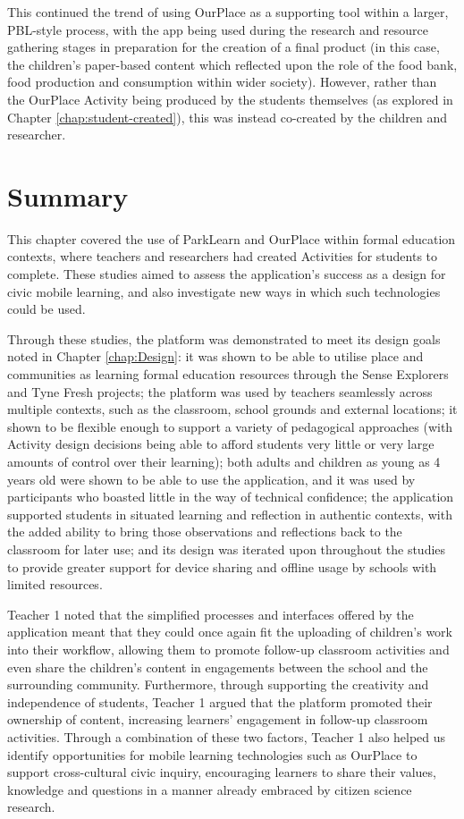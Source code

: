 This continued the trend of using OurPlace as a supporting tool within a larger, PBL-style process, with the app being used during the research and resource gathering stages in preparation for the creation of a final product (in this case, the children's paper-based content which reflected upon the role of the food bank, food production and consumption within wider society). However, rather than the OurPlace Activity being produced by the students themselves (as explored in Chapter \ref{chap:student-created}), this was instead co-created by the children and researcher.

\section{Summary}

This chapter covered the use of ParkLearn and OurPlace within formal education contexts, where teachers and researchers had created Activities for students to complete. These studies aimed to assess the application's success as a design for civic mobile learning, and also investigate new ways in which such technologies could be used. 

Through these studies, the platform was demonstrated to meet its design goals noted in Chapter \ref{chap:Design}: it was shown to be able to utilise place and communities as learning formal education resources through the Sense Explorers and Tyne Fresh projects; the platform was used by teachers seamlessly across multiple contexts, such as the classroom, school grounds and external locations; it shown to be flexible enough to support a variety of pedagogical approaches (with Activity design decisions being able to afford students very little or very large amounts of control over their learning); both adults and children as young as 4 years old were shown to be able to use the application, and it was used by participants who boasted little in the way of technical confidence; the application supported students in situated learning and reflection in authentic contexts, with the added ability to bring those observations and reflections back to the classroom for later use; and its design was iterated upon throughout the studies to provide greater support for device sharing and offline usage by schools with limited resources. 

Teacher 1 noted that the simplified processes and interfaces offered by the application meant that they could once again fit the uploading of children’s work into their workflow, allowing them to promote follow-up classroom activities and even share the children's content in engagements between the school and the surrounding community. Furthermore, through supporting the creativity and independence of students, Teacher 1 argued that the platform promoted their ownership of content, increasing learners’ engagement in follow-up classroom activities. Through a combination of these two factors, Teacher 1 also helped us identify opportunities for mobile learning technologies such as OurPlace to support cross-cultural civic inquiry, encouraging learners to share their values, knowledge and questions in a manner already embraced by citizen science research.

